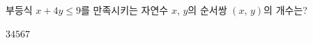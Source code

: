 부등식 $x+4y\le 9$를 만족시키는 자연수 $x$, $y$의 순서쌍 $(x,\,y)$의 개수는?
\begin{choices32}{$3$}{$4$}{$5$}{$6$}{$7$}\end{choices32}
